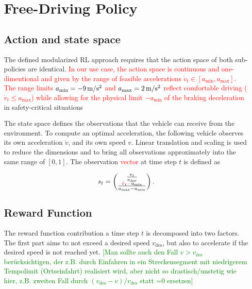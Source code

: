 \documentclass[review]{elsarticle}
\providecommand{\red}[1]{\textcolor{red}{#1}}
\providecommand{\green}[1]{\textcolor{green}{#1}}
\providecommand{\martin}[1]{\red{#1}} %
\providecommand{\martinc}[1]{\green{[#1]}} %
\providecommand{\sub}[1]{_{\mathrm{#1}}}  %
\providecommand{\3}{{\ss}}
\begin{document}
  
  



\section{Free-Driving Policy}
\label{sec:FreeDrivingPolicy}
\subsection{Action and state space}
\label{stateSpaceFree}
 The defined modularized RL approach requires that the action space of
 both sub-policies are identical. \martin{In our use case, the action space is
 continuous and one-dimentional and given by the range of feasible accelerations
 $\dot{v}_t \in [a\sub{min}, a\sub{max}]$. The range limits
 $a\sub{min}= \unit[-9]{m/s^2}$ and  $a\sub{max} =\unit[2]{m/s^2}$
 reflect comfortable driving ($\dot{v}_t \le a\sub{max}$) while
 allowing for the physical limit $-a\sub{min}$ of the braking
 deceleration} in safety-critical
situations

The state space defines the observations that the 
vehicle can receive from the environment. To compute an optimal
acceleration, the following vehicle observes its own acceleration $\dot{v}$,
and its own speed $v$. Linear translation and scaling is used to
reduce the dimensions and to bring all observations approximately into
the same range of $[0,1]$. The observation \martin{vector} at time step $t$ is defined
as 

\begin{equation}
\label{eq:stateFree}
s_t = \begin{pmatrix} \frac{v_t}{v\sub{des}} \\ \frac{\martin{\dot{v}}_t-a\sub{\rm min}}{a\sub{\rm max} - a\sub{\rm min}}\end{pmatrix}.
\end{equation}
\subsection{Reward Function}
\label{rewardFunctionFree}
The reward function contribution a time step $t$ is decomposed into two factors. The first part aims to
not exceed a desired speed $v\sub{des}$, but also to accelerate if the
desired speed is not reached yet.  
\martinc{Man sollte auch den Fall $v>v\sub{des}$ ber\"ucksichtigen,
  der z.B. durch Einfahren in ein Streckensegment mit niedrigerem
  Tempolimit (Ortseinfahrt) realisiert wird, aber nicht so
  drastisch/unstetig wie hier, z.B. zweiten Fall durch
  $(v\sub{des}-v)/v\sub{des}$ statt =0 ersetzen}
\end{document}

